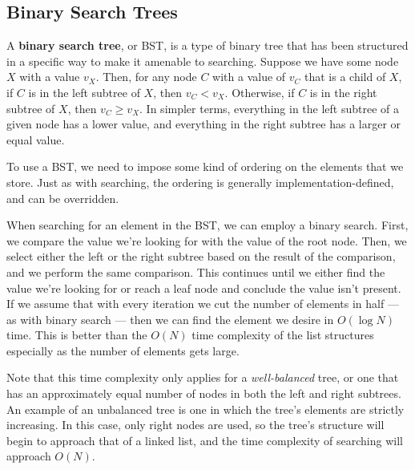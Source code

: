 \subsection{Binary Search Trees}

A \textbf{binary search tree}, or BST, is a type of binary tree that has been structured in a specific way to make it amenable to searching. Suppose we have some node $X$ with a value $v_X$. Then, for any node $C$ with a value of $v_C$ that is a child of $X$, if $C$ is in the left subtree of $X$, then $v_C < v_X$. Otherwise, if $C$ is in the right subtree of $X$, then $v_C \geq v_X$. In simpler terms, everything in the left subtree of a given node has a lower value, and everything in the right subtree has a larger or equal value.

To use a BST, we need to impose some kind of ordering on the elements that we store. Just as with searching, the ordering is generally implementation-defined, and can be overridden.

When searching for an element in the BST, we can employ a binary search. First, we compare the value we're looking for with the value of the root node. Then, we select either the left or the right subtree based on the result of the comparison, and we perform the same comparison. This continues until we either find the value we're looking for or reach a leaf node and conclude the value isn't present. If we assume that with every iteration we cut the number of elements in half --- as with binary search --- then we can find the element we desire in $O(\log{N})$ time. This is better than the $O(N)$ time complexity of the list structures especially as the number of elements gets large.

Note that this time complexity only applies for a \textit{well-balanced} tree, or one that has an approximately equal number of nodes in both the left and right subtrees. An example of an unbalanced tree is one in which the tree's elements are strictly increasing. In this case, only right nodes are used, so the tree's structure will begin to approach that of a linked list, and the time complexity of searching will approach $O(N)$.


